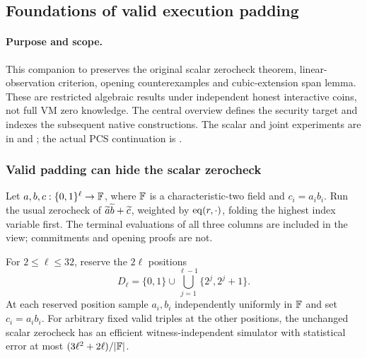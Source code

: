 \subsection{Foundations of valid execution padding}\label{note:zk-padding-foundations}

\paragraph{Purpose and scope.} This companion to  preserves the original scalar zerocheck theorem, linear-observation criterion, opening counterexamples and cubic-extension span lemma. These are restricted algebraic results under independent honest interactive coins, not full VM zero knowledge. The central overview defines the security target and indexes the subsequent native constructions. The scalar and joint experiments are in  and ; the actual PCS continuation is .

\subsubsection{Valid padding can hide the scalar zerocheck}

Let $a,b,c:\{0,1\}^{\ell}\to\mathbb{F}$, where $\mathbb{F}$ is a characteristic-two field and $c_i=a_ib_i$. Run the usual zerocheck of $\widetilde{a}\widetilde{b}+\widetilde{c}$, weighted by $\operatorname{eq}(r,\cdot)$, folding the highest index variable first. The terminal evaluations of all three columns are included in the view; commitments and opening proofs are not.

\begin{proposition}\label{prop:scalar}
For $2\le\ell\le32$, reserve the $2\ell$ positions
\[
 D_\ell=\{0,1\}\cup\bigcup_{j=1}^{\ell-1}\{2^j,2^j+1\}.
\]
At each reserved position sample $a_i,b_i$ independently uniformly in $\mathbb{F}$ and set $c_i=a_ib_i$. For arbitrary fixed valid triples at the other positions, the unchanged scalar zerocheck has an efficient witness-independent simulator with statistical error at most $(3\ell^2+2\ell)/|\mathbb{F}|$.
\end{proposition}

